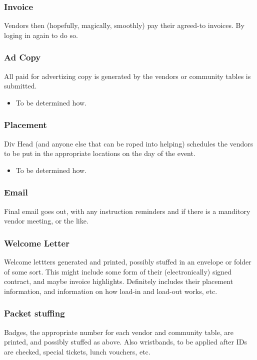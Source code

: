 \documentclass[captions=tablesignature]{scrartcl}
\begin{document}
\subsubsection{Invoice}
\label{sec-3-2-15}
Vendors then (hopefully, magically, smoothly) pay their agreed-to
invoices.  By loging in again to do so.

\subsubsection{Ad Copy}
\label{sec-3-2-16}
All paid for advertizing copy is generated by the vendors or
community tables is submitted.
\begin{itemize}
\item To be determined how.
\end{itemize}

\subsubsection{Placement}
\label{sec-3-2-17}
Div Head (and anyone else that can be roped into helping)
schedules the vendors to be put in the appropriate locations on
the day of the event.
\begin{itemize}
\item To be determined how.
\end{itemize}

\subsubsection{Email}
\label{sec-3-2-18}
Final email goes out, with any instruction reminders and if there
is a manditory vendor meeting, or the like.

\subsubsection{Welcome Letter}
\label{sec-3-2-19}
Welcome lettters generated and printed, possibly stuffed in an
envelope or folder of some sort.
This might include some form of their (electronically) signed
contract, and maybe invoice highlights.  Definitely includes their
placement information, and information on how load-in and load-out
works, etc.

\subsubsection{Packet stuffing}
\label{sec-3-2-20}
Badges, the appropriate number for each vendor and community
table, are printed, and possibly stuffed as above.  Also
wristbands, to be applied after IDs are checked, special tickets,
lunch vouchers, etc.
\end{document}
